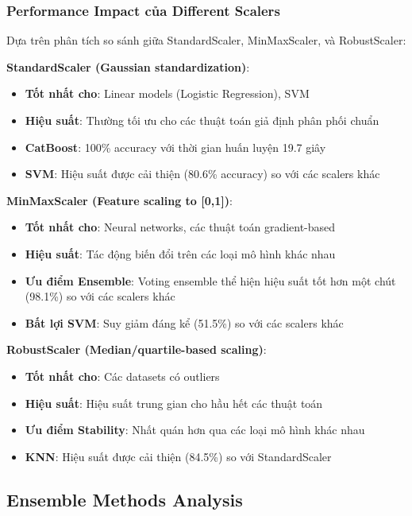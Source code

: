 \subsubsection{Performance Impact của Different Scalers}

Dựa trên phân tích so sánh giữa StandardScaler, MinMaxScaler, và RobustScaler:

\textbf{StandardScaler (Gaussian standardization)}:
\begin{itemize}
    \item \textbf{Tốt nhất cho}: Linear models (Logistic Regression), SVM
    \item \textbf{Hiệu suất}: Thường tối ưu cho các thuật toán giả định phân phối chuẩn
    \item \textbf{CatBoost}: 100\% accuracy với thời gian huấn luyện 19.7 giây
    \item \textbf{SVM}: Hiệu suất được cải thiện (80.6\% accuracy) so với các scalers khác
\end{itemize}

\textbf{MinMaxScaler (Feature scaling to [0,1])}:
\begin{itemize}
    \item \textbf{Tốt nhất cho}: Neural networks, các thuật toán gradient-based
    \item \textbf{Hiệu suất}: Tác động biến đổi trên các loại mô hình khác nhau
    \item \textbf{Ưu điểm Ensemble}: Voting ensemble thể hiện hiệu suất tốt hơn một chút (98.1\%) so với các scalers khác
    \item \textbf{Bất lợi SVM}: Suy giảm đáng kể (51.5\%) so với các scalers khác
\end{itemize}

\textbf{RobustScaler (Median/quartile-based scaling)}:
\begin{itemize}
    \item \textbf{Tốt nhất cho}: Các datasets có outliers
    \item \textbf{Hiệu suất}: Hiệu suất trung gian cho hầu hết các thuật toán
    \item \textbf{Ưu điểm Stability}: Nhất quán hơn qua các loại mô hình khác nhau
    \item \textbf{KNN}: Hiệu suất được cải thiện (84.5\%) so với StandardScaler
\end{itemize}

\subsection{Ensemble Methods Analysis}\label{subsec:detailed-ensemble-analysis}

